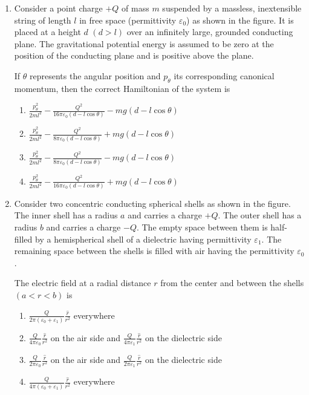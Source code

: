 \documentclass[journal]{IEEEtran}
\begin{document}
\begin{enumerate}

\item Consider a point charge $+Q$ of mass $m$ suspended by a massless, inextensible string of length $l$ in free space (permittivity $\varepsilon_0$) as shown in the figure. It is placed at a height $d$ $(d>l)$ over an infinitely large, grounded conducting plane. The gravitational potential energy is assumed to be zero at the position of the conducting plane and is positive above the plane.

\vspace{0.5 cm}



If $\theta$ represents the angular position and $p_\theta$ its corresponding canonical momentum, then the correct Hamiltonian of the system is

\begin{enumerate}
\item $\frac{p^2_\theta}{2ml^2}-\frac{Q^2}{16\pi\varepsilon_0(d-l\cos{\theta})}-mg(d-l\cos{\theta})$
\item $\frac{p^2_\theta}{2ml^2}-\frac{Q^2}{8\pi\varepsilon_0(d-l\cos{\theta})}+mg(d-l\cos{\theta})$
\item $\frac{p^2_\theta}{2ml^2}-\frac{Q^2}{8\pi\varepsilon_0(d-l\cos{\theta})}-mg(d-l\cos{\theta})$
\item $\frac{p^2_\theta}{2ml^2}-\frac{Q^2}{16\pi\varepsilon_0(d-l\cos{\theta})}+mg(d-l\cos{\theta})$
\end{enumerate}

\item Consider two concentric conducting spherical shells as shown in the figure. The inner shell has a radius $a$ and carries a charge $+Q$. The outer shell has a radius $b$ and carries a charge $-Q$. The empty space between them is half-filled by a hemispherical shell of a dielectric having permittivity $\varepsilon_1$. The remaining space between the shells is filled with air having the permittivity $\varepsilon_0$.



The electric field at a radial distance $r$ from the center and between the shells $(a<r<b)$ is

\begin{enumerate}
\item $\frac{Q}{2\pi(\varepsilon_0+\varepsilon_1)}\frac{\hat{r}}{r^2}$ everywhere
\item $\frac{Q}{4\pi\varepsilon_0}\frac{\hat{r}}{r^2}$ on the air side and $\frac{Q}{4\pi\varepsilon_1}\frac{\hat{r}}{r^2}$ on the dielectric side
\item $\frac{Q}{2\pi\varepsilon_0}\frac{\hat{r}}{r^2}$ on the air side and $\frac{Q}{2\pi\varepsilon_1}\frac{\hat{r}}{r^2}$ on the dielectric side
\item $\frac{Q}{4\pi(\varepsilon_0+\varepsilon_1)}\frac{\hat{r}}{r^2}$ everywhere
\end{enumerate}


\end{enumerate}
\end{document}

